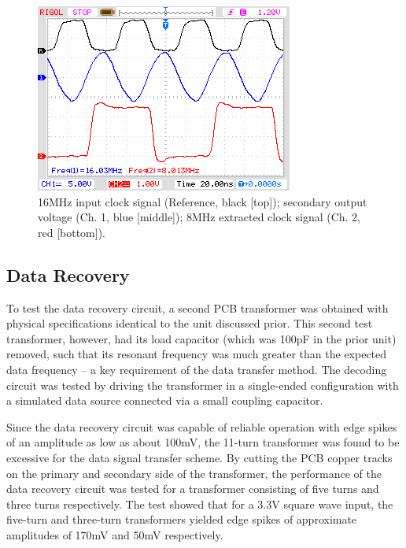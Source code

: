 \documentclass[conference]{IEEEtran}
\begin{document}
	\begin{figure}[t]
		\centering
		\includegraphics[width=0.8\columnwidth]{./img/Clock}
		\caption{16MHz input clock signal (Reference, black [top]); secondary output voltage (Ch. 1, blue [middle]); 8MHz extracted clock signal (Ch. 2, red [bottom]).}
		\label{fig:Clock}
	\end{figure}
	
	\subsection{Data Recovery}
	To test the data recovery circuit, a second PCB transformer was obtained with physical specifications identical to the unit discussed prior.  This second test transformer, however, had its load capacitor (which was 100pF in the prior unit) removed, such that its resonant frequency was much greater than the expected data frequency -- a key requirement of the data transfer method.  The decoding circuit was tested by driving the transformer in a single-ended configuration with a simulated data source connected via a small coupling capacitor.
	
	Since the data recovery circuit was capable of reliable operation with edge spikes of an amplitude as low as about 100mV, the 11-turn transformer was found to be excessive for the data signal transfer scheme.  By cutting the PCB copper tracks on the primary and secondary side of the transformer, the performance of the data recovery circuit was tested for a transformer consisting of five turns and three turns respectively.  The test showed that for a 3.3V square wave input, the five-turn and three-turn transformers yielded edge spikes of approximate amplitudes of 170mV and 50mV respectively.
	
\end{document}
